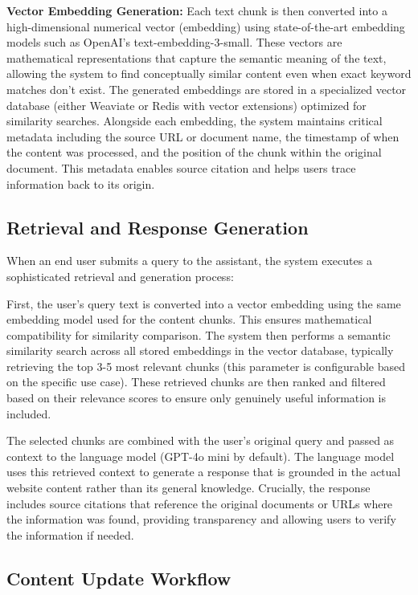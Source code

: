 \textbf{Vector Embedding Generation:}
Each text chunk is then converted into a high-dimensional numerical vector (embedding) using state-of-the-art embedding models such as OpenAI's text-embedding-3-small. These vectors are mathematical representations that capture the semantic meaning of the text, allowing the system to find conceptually similar content even when exact keyword matches don't exist. The generated embeddings are stored in a specialized vector database (either Weaviate or Redis with vector extensions) optimized for similarity searches. Alongside each embedding, the system maintains critical metadata including the source URL or document name, the timestamp of when the content was processed, and the position of the chunk within the original document. This metadata enables source citation and helps users trace information back to its origin.

\subsection{Retrieval and Response Generation}

When an end user submits a query to the assistant, the system executes a sophisticated retrieval and generation process:

First, the user's query text is converted into a vector embedding using the same embedding model used for the content chunks. This ensures mathematical compatibility for similarity comparison. The system then performs a semantic similarity search across all stored embeddings in the vector database, typically retrieving the top 3-5 most relevant chunks (this parameter is configurable based on the specific use case). These retrieved chunks are then ranked and filtered based on their relevance scores to ensure only genuinely useful information is included.

The selected chunks are combined with the user's original query and passed as context to the language model (GPT-4o mini by default). The language model uses this retrieved context to generate a response that is grounded in the actual website content rather than its general knowledge. Crucially, the response includes source citations that reference the original documents or URLs where the information was found, providing transparency and allowing users to verify the information if needed.

\subsection{Content Update Workflow}

